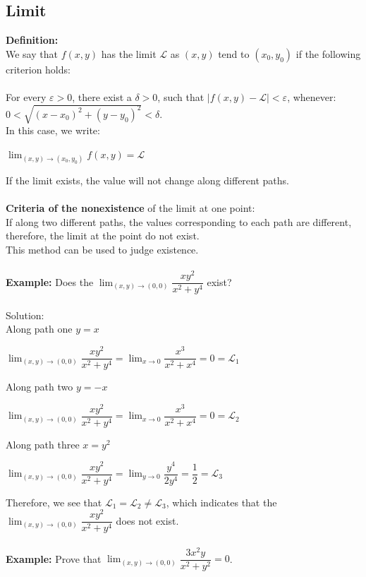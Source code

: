 \documentclass[UTF8,a4paper, 10pt, openany]{book}
\begin{document}
\subsection{Limit}
\textbf{Definition:}\\
We say that $f(x,y)$ has the limit $\mathcal{L}$ as $(x,y)$ tend to $(x_0,y_0)$ if the following criterion holds:
\\ \\For every $\varepsilon > 0$, there exist a $\delta >0$, such that $|f(x,y)-\mathcal{L}|<\varepsilon $, whenever: $0<\sqrt{(x-x_0)^2+(y-y_0)^2}<\delta$. \\
In this case, we write:
\begin{center}
$\displaystyle\lim_{(x,y) \to (x_0,y_0)} f(x,y) = \mathcal{L}$
\end{center}
If the limit exists, the value will not change along different paths.\\ \\
\textbf{Criteria of the nonexistence} of the limit at one point:\\
If along two different paths, the values corresponding to each path are different, therefore, the limit at the point do not exist.\\
This method can be used to judge existence.\\ \\
\textbf{Example:} Does the $\displaystyle\lim_{(x,y) \to (0,0)} \dfrac{xy^2}{x^2+y^4}$ exist?\\ \\Solution:\\
Along path one $y=x$
\begin{center}
$\displaystyle\lim_{(x,y) \to (0,0)} \dfrac{xy^2}{x^2+y^4}=\displaystyle\lim_{x \to 0} \dfrac{x^3}{x^2+x^4}=0=\mathcal{L}_1$
\end{center}
Along path two $y=-x$
\begin{center}
$\displaystyle\lim_{(x,y) \to (0,0)} \dfrac{xy^2}{x^2+y^4}=\displaystyle\lim_{x \to 0} \dfrac{x^3}{x^2+x^4}=0=\mathcal{L}_2$
\end{center}
Along path three $x=y^2$
\begin{center}
$\displaystyle\lim_{(x,y) \to (0,0)} \dfrac{xy^2}{x^2+y^4}=\displaystyle\lim_{y \to 0}\dfrac{y^4}{2y^4}=\dfrac{1}{2}=\mathcal{L}_3$
\end{center}
Therefore, we see that $\mathcal{L}_1=\mathcal{L}_2 \neq \mathcal{L}_3$, which indicates that the $\lim_{(x,y) \to (0,0)} \dfrac{xy^2}{x^2+y^4}$ does not exist.\\ \\
\textbf{Example:}  Prove that $\displaystyle\lim_{(x,y) \to (0,0)} \dfrac{3x^2y }{x^2+y^2}=0$.\\ \\
\end{document}
